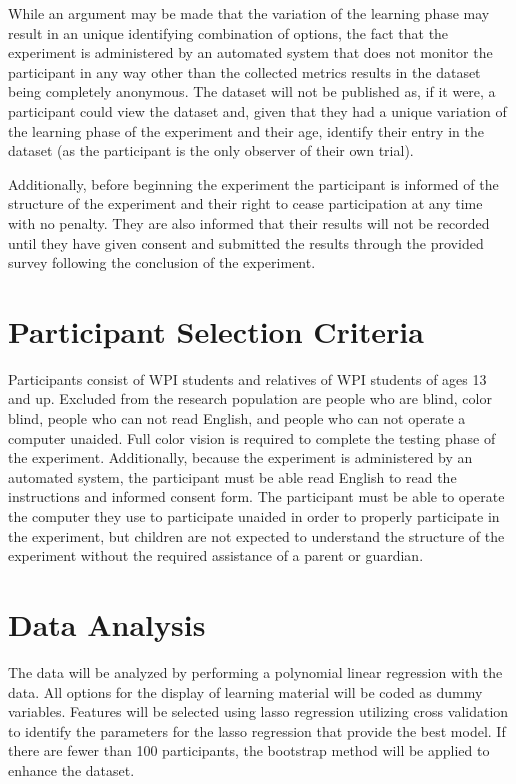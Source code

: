 \documentclass[12pt]{report}
\begin{document}
While an argument may be made that the variation of the learning phase may result in an unique identifying combination of options, the fact that the experiment is administered by an automated system that does not monitor the participant in any way other than the collected metrics results in the dataset being completely anonymous. The dataset will not be published as, if it were, a participant could view the dataset and, given that they had a unique variation of the learning phase of the experiment and their age, identify their entry in the dataset (as the participant is the only observer of their own trial).

Additionally, before beginning the experiment the participant is informed of the structure of the experiment and their right to cease participation at any time with no penalty. They are also informed that their results will not be recorded until they have given consent and submitted the results through the provided survey following the conclusion of the experiment.

\section{Participant Selection Criteria}

Participants consist of WPI students and relatives of WPI students of ages 13 and up. Excluded from the research population are people who are blind, color blind, people who can not read English, and people who can not operate a computer unaided. Full color vision is required to complete the testing phase of the experiment. Additionally, because the experiment is administered by an automated system, the participant must be able read English to read the instructions and informed consent form. The participant must be able to operate the computer they use to participate unaided in order to properly participate in the experiment, but children are not expected to understand the structure of the experiment without the required assistance of a parent or guardian.

\section{Data Analysis}
\label{sec:anal}

The data will be analyzed by performing a polynomial linear regression \cite{peckov2012machine} with the data. All options for the display of learning material will be coded as dummy variables. Features will be selected using lasso regression utilizing cross validation to identify the parameters for the lasso regression that provide the best model. If there are fewer than 100 participants, the bootstrap method \cite{kohavi1995study} will be applied to enhance the dataset.
\end{document}
